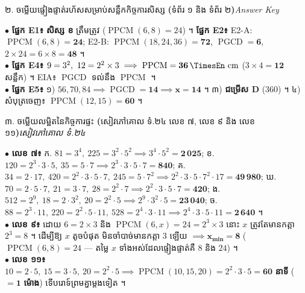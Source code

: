 \documentclass[a4paper,10pt]{article}
\newcommand{\en}[1]{{\TimesEn #1}}
\newcommand{\enbf}[1]{{\TimesEn\bfseries #1}}
\newcommand{\unit}[1]{\,\text{\en{#1}}}
\newcommand{\secstrip}[2]{%
  \vspace{3pt}%
  \begin{tcolorbox}[
    enhanced, sharp corners, colback=panelgray, colframe=black,
    boxrule=0.8pt, boxsep=0.8pt, top=2pt, bottom=2pt, left=5pt, right=5pt,
    after skip=3pt
  ]
    {\muol\fontsize{8.5pt}{12.2pt}\selectfont #1}\hfill{\fontsize{7.8pt}{10.8pt}\selectfont\textit{#2}}
  \end{tcolorbox}%
}
\begin{document}
\vfill
\secstrip{២. ចម្លើយផ្ទៀងផ្ទាត់រហ័សសម្រាប់សន្លឹកកិច្ចការសិស្ស \enbf{(}ទំព័រ ១ និង ទំព័រ ២\enbf{)}}{\en{Answer Key}}

\begin{tcolorbox}[
  enhanced, sharp corners, colback=white, colframe=black,
  boxrule=0.8pt, boxsep=2.5pt, top=4pt, bottom=4pt, left=6pt, right=6pt
]
  \fontsize{8.8pt}{12.9pt}\selectfont
  $\bullet$ \textbf{ផ្នែក \en{E1}៖} \textbf{សិស្ស ខ} ត្រឹមត្រូវ ($\operatorname{PPCM}(6,8)=24$) ។ \textbf{ផ្នែក \en{E2}៖} \en{E2-A}: $\operatorname{PPCM}(6,8)=\mathbf{24}$; \en{E2-B}: $\operatorname{PPCM}(18,24,36)=\mathbf{72}$, $\operatorname{PGCD}=\mathbf{6}$, $2\times 24=6\times 8=\mathbf{48}$ ។\\[2pt]
  $\bullet$ \textbf{ផ្នែក \en{E4}៖} $9=3^2,\ 12=2^2\times 3 \implies \operatorname{PPCM}=\mathbf{36\unit{cm}}$ ($3\times 4 = \mathbf{12}$ សន្លឹក) ។ \en{EIA}៖ $\operatorname{PGCD}$ ទល់នឹង $\operatorname{PPCM}$ ។\\[2pt]
  $\bullet$ \textbf{ផ្នែក \en{E5}៖} ១) $56, 70, 84 \implies \operatorname{PGCD}=\mathbf{14} \implies \mathbf{x=14}$ ។ ៣) \textbf{ជម្រើស \en{D}} ($360$) ។ ៤) សំបុត្រចេញ៖ $\operatorname{PPCM}(12,15)=\mathbf{60}$ ។
\end{tcolorbox}

\vfill
\secstrip{៣. ចម្លើយលម្អិតនៃកិច្ចការផ្ទះ \enbf{(}សៀវភៅគោល ទំ.២៤ លេខ ៧, លេខ ៩ និង លេខ ១១\enbf{)}}{សៀវភៅគោល ទំ.២៤}

\begin{tcolorbox}[
  enhanced, sharp corners, colback=white, colframe=black,
  boxrule=0.8pt, boxsep=2.5pt, top=4pt, bottom=4pt, left=6pt, right=6pt
]
  \fontsize{8.45pt}{12.4pt}\selectfont
  $\bullet$ \textbf{លេខ ៧៖} ក. $81=3^4,\ 225=3^2\cdot 5^2 \implies 3^4\cdot 5^2=\mathbf{2\,025}$;\; ខ. $120=2^3\cdot 3\cdot 5,\ 35=5\cdot 7 \implies 2^3\cdot 3\cdot 5\cdot 7=\mathbf{840}$;\; គ. $34=2\cdot 17,\ 420=2^2\cdot 3\cdot 5\cdot 7,\ 245=5\cdot 7^2 \implies 2^2\cdot 3\cdot 5\cdot 7^2\cdot 17=\mathbf{49\,980}$;\; ឃ. $70=2\cdot 5\cdot 7,\ 21=3\cdot 7,\ 28=2^2\cdot 7 \implies 2^2\cdot 3\cdot 5\cdot 7=\mathbf{420}$;\; ង. $512=2^9,\ 18=2\cdot 3^2,\ 20=2^2\cdot 5 \implies 2^9\cdot 3^2\cdot 5=\mathbf{23\,040}$;\; ច. $88=2^3\cdot 11,\ 220=2^2\cdot 5\cdot 11,\ 528=2^4\cdot 3\cdot 11 \implies 2^4\cdot 3\cdot 5\cdot 11=\mathbf{2\,640}$ ។\\[2pt]
  $\bullet$ \textbf{លេខ ៩៖} ដោយ $6 = 2\times 3$ និង $\operatorname{PPCM}(6, x) = 24 = 2^3\times 3$ នោះ $x$ ត្រូវតែមានកត្តា $2^3 = 8$ ។ ដើម្បីឱ្យ $x$ តូចបំផុត មិនចាំបាច់មានកត្តា $3$ ឡើយ $\implies \mathbf{x_{\min} = 8}$ ($\operatorname{PPCM}(6,8)=24$ — តម្លៃ $x$ ទាំងអស់ដែលផ្ទៀងផ្ទាត់គឺ $8$ និង $24$) ។\\[2pt]
  $\bullet$ \textbf{លេខ ១១៖} $10=2\cdot 5,\ 15=3\cdot 5,\ 20=2^2\cdot 5 \implies \operatorname{PPCM}(10, 15, 20) = 2^2\cdot 3\cdot 5 = \mathbf{60}$ \textbf{នាទី} ($= \mathbf{1}$ \textbf{ម៉ោង}) ទើបរោទ៍ព្រមគ្នាម្ដងទៀត ។
\end{tcolorbox}
\end{document}
